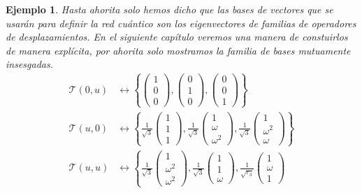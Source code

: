 \documentclass[a4paper]{report}
\newtheorem{example}{Ejemplo}
\begin{document}
\begin{example}
    Hasta ahorita solo hemos dicho que las bases de vectores
    que se usarán para definir la red cuántico son los
    eigenvectores de familias de operadores de
    desplazamientos. En el siguiente capítulo veremos una
    manera de constuirlos de manera explícita, por ahorita
    solo mostramos la familia de bases mutuamente
    insesgadas.
    \begin{align}
      \mathcal T(0,u)
      &\leftrightarrow \left\{
      \begin{pmatrix} 1\\0\\0 \end{pmatrix},
      \begin{pmatrix} 0\\1\\0 \end{pmatrix},
      \begin{pmatrix} 0\\0\\1 \end{pmatrix} 
      \right\} \\
      \mathcal T(u,0)
      &\leftrightarrow \left\{
        \frac{1}{\sqrt{3}}
        \begin{pmatrix} 1\\1\\1 \end{pmatrix},
        \frac{1}{\sqrt{3}}
        \begin{pmatrix} 1\\ \omega\\ \omega^2 \end{pmatrix},
        \frac{1}{\sqrt{3}}
        \begin{pmatrix} 1\\ \omega^2\\ \omega \end{pmatrix} 
      \right\} \\
      \mathcal T(u,u)
      &\leftrightarrow \left\{
        \frac{1}{\sqrt{3}}
        \begin{pmatrix} 1\\ \omega^2 \\ \omega^2
        \end{pmatrix},
        \frac{1}{\sqrt{3}}
        \begin{pmatrix} 1\\1\\ \omega \end{pmatrix},
        \frac{1}{\sqrt{r_3}}
        \begin{pmatrix} 1\\ \omega\\ 1 \end{pmatrix}

\end{align}
\end{example}
\end{document}
